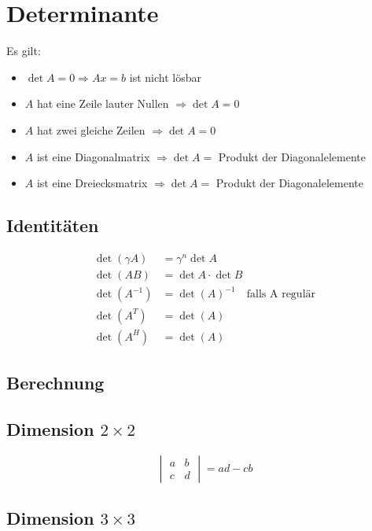 \documentclass[11pt]{article}
\begin{document}
\section{Determinante}

Es gilt:
\begin{itemize}
	\item $\det A = 0 \Rightarrow Ax = b$ ist nicht l{\"o}sbar
	\item $A$ hat eine Zeile lauter Nullen $\Rightarrow \det A = 0$
	\item $A$ hat zwei gleiche Zeilen $\Rightarrow \det A = 0$
	\item $A$ ist eine Diagonalmatrix $\Rightarrow \det A =$ Produkt der Diagonalelemente
	\item $A$ ist eine Dreiecksmatrix $\Rightarrow \det A =$ Produkt der Diagonalelemente
\end{itemize}

\subsection{Identit{\"a}ten}

\begin{equation*}
\begin{split}
	\det(\gamma A)  & = \gamma^n \det A \\
	\det(AB) & = \det A \cdot \det B \\
	\det(A^{-1}) & = \det(A)^{-1} \quad\text{falls A regul{\"a}r} \\
	\det(A^T) & = \det(A) \\
	\det(A^H) & = \det(A)
\end{split}
\end{equation*}

\subsection{Berechnung}

\subsection{Dimension $2\times 2$}

\begin{equation*}
	\begin{vmatrix}
		a & b \\ c & d
	\end{vmatrix} = ad - cb
\end{equation*}

\subsection{Dimension $3\times 3$}
\end{document}

